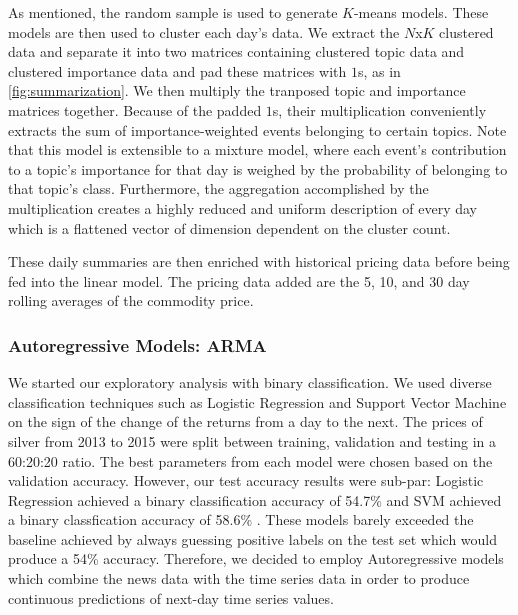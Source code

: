 As mentioned, the random sample is used to generate $K$-means models. These models are then used to cluster each day's data. We extract the $N$x$K$ clustered data and separate it into two matrices containing clustered topic data and clustered importance data and pad these matrices with $1$s, as in \ref{fig:summarization}. We then multiply the tranposed topic and importance matrices together. Because of the padded $1$s, their multiplication conveniently extracts the sum of importance-weighted events belonging to certain topics. Note that this model is extensible to a mixture model, where each event's contribution to a topic's importance for that day is weighed by the probability of belonging to that topic's class. Furthermore, the aggregation accomplished by the multiplication creates a highly reduced and uniform description of every day which is a flattened vector of dimension dependent on the cluster count.

These daily summaries are then enriched with historical pricing data before being fed into the linear model. The pricing data added are the 5, 10, and 30 day rolling averages of the commodity price. %


\subsubsection{Autoregressive Models: ARMA}
We started our exploratory analysis with binary classification. We used diverse classification techniques such as Logistic Regression and Support Vector Machine on the sign of the change of the returns from a day to the next. The prices of silver from 2013 to 2015 were split between training, validation and testing in a 60:20:20 ratio. The best parameters from each model were chosen based on the validation accuracy. However, our test accuracy results were sub-par: Logistic Regression achieved a binary classification accuracy of 54.7\% and SVM achieved a binary classfication accuracy of 58.6\% . These models barely exceeded the baseline achieved by always guessing positive labels on the test set which would produce a 54\% accuracy. Therefore, we decided to employ Autoregressive models which combine the news data with the time series data in order to produce continuous predictions of next-day time series values.

